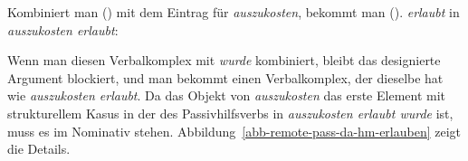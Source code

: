 {\noindent
Kombiniert man () mit dem Eintrag für \emph{auszukosten}, bekommt man ().
\eas
\emph{erlaubt} in \emph{auszukosten erlaubt}:\\
\zs
\largerpage

\noindent
Wenn man diesen Verbalkomplex mit \emph{wurde} kombiniert, bleibt das designierte Argument
blockiert, und man bekommt einen Verbalkomplex, der dieselbe \compsl hat wie \emph{auszukosten erlaubt}.
Da das Objekt von \emph{auszukosten} das erste Element mit strukturellem Kasus in der \argstl des
Passivhilfsverbs in \emph{auszukosten erlaubt wurde} ist, muss es im Nominativ stehen.
%
Abbildung~\vref{abb-remote-pass-da-hm-erlauben} zeigt die Details.
\begin{figure}
\end{figure}}
